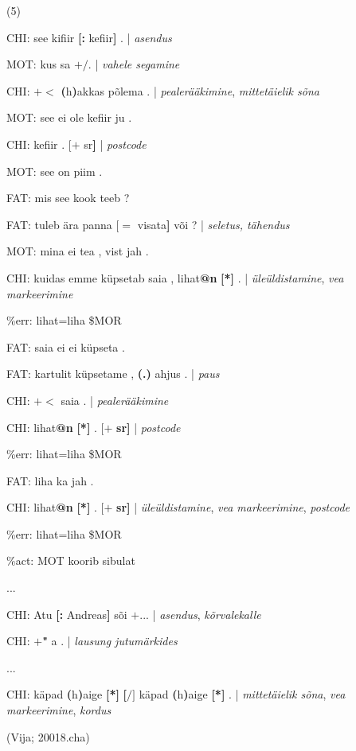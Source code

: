 \documentclass[12pt]{article}
\begin{document}
(5)
\begin{description}
    \item*CHI:   see kifiir \textbf{[:} kefiir\textbf{]} . | \emph{asendus}
    \item*MOT:   kus sa $\pmb{+/}$. | \emph{vahele segamine}
    \item*CHI:   $\pmb{+<}$ \textbf{(}h\textbf{)}akkas põlema . | \emph{pealerääkimine}, \emph{mittetäielik sõna}
    \item*MOT:   see ei ole kefiir ju .
    \item*CHI:   kefiir . $\pmb{[+}$ sr\textbf{]} | \emph{postcode}
    \item*MOT:   see on piim .
    \item*FAT:   mis see kook teeb ?
    \item*FAT:   tuleb ära panna $\pmb{[=}$ visata\textbf{]} või ? | \emph{seletus, tähendus}
    \item*MOT:   mina ei tea , vist jah .
    \item*CHI:   kuidas emme küpsetab saia , lihat\textbf{@n} \textbf{[*]} . | \emph{üleüldistamine}, \emph{vea markeerimine}
    \item\%err:   lihat=liha \$MOR
    \item*FAT:   saia ei ei küpseta .
    \item*FAT:   kartulit küpsetame , \textbf{(.)} ahjus . | \emph{paus}
    \item*CHI:   $\pmb{+<}$ saia . | \emph{pealerääkimine}
    \item*CHI:   lihat\textbf{@n} \textbf{[*]} . $\pmb{[+}$ \textbf{sr]} | \emph{postcode}
    \item\%err:   lihat=liha \$MOR
    \item*FAT:   liha ka jah .
    \item*CHI:   lihat\textbf{@n} \textbf{[*]} . $\pmb{[+}$ \textbf{sr]} | \emph{üleüldistamine}, \emph{vea markeerimine}, \emph{postcode}
    \item\%err:   lihat=liha \$MOR
    \item\%act:   MOT koorib sibulat
    \item...
    \item*CHI:   Atu \textbf{[:} Andreas\textbf{]} sõi $\pmb{+...}$ | \emph{asendus}, \emph{kõrvalekalle}
    \item*CHI:   $\pmb{+}$\textbf{"} a . | \emph{lausung jutumärkides}
    \item...
    \item*CHI:   käpad \textbf{(}h\textbf{)}aige \textbf{[*]} \textbf{[$\pmb{/]}$} käpad \textbf{(}h\textbf{)}aige \textbf{[*]} . | \emph{mittetäielik sõna}, \emph{vea markeerimine}, \emph{kordus}
    \item (Vija; 20018.cha)\\
\end{description}
\end{document}
